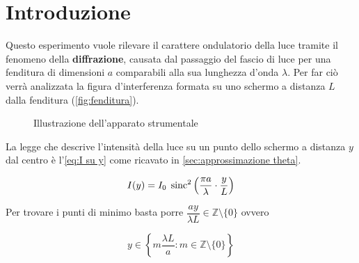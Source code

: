 \documentclass[../main.tex]{subfiles}
\begin{document}
\section{Introduzione}

Questo esperimento vuole rilevare il carattere ondulatorio della luce tramite il fenomeno della \textbf{diffrazione}, causata dal passaggio del fascio di luce per una fenditura di dimensioni $a$ comparabili alla sua lunghezza d'onda $\lambda$. Per far ciò verrà analizzata la figura d'interferenza formata su uno schermo a distanza $L$ dalla fenditura (\autoref{fig:fenditura}).

\begin{figure}[ht!]
    \centering
    \caption{Illustrazione dell'apparato strumentale}
    \label{fig:fenditura}
\end{figure}

La legge che descrive l'intensità della luce su un punto dello schermo a distanza $y$ dal centro è l'\autoref{eq:I su y} come ricavato in \autoref{sec:approssimazione theta}.

\begin{equation} \label{eq:I su y}
    I(y) = I_{0} \; \operatorname{sinc}^{2} \left( \frac{\pi a}{\lambda} \cdot \frac{y}{L}  \right)
\end{equation}

Per trovare i punti di minimo basta porre $\dfrac{a y}{\lambda L} \in \mathbb{Z} \setminus \{0\}$ ovvero

\begin{equation} \label{eq:y=0 values}
    y \in \left\{m\frac{\lambda L}{a}: m \in \mathbb{Z} \setminus \{0\} \right\}
\end{equation}

\end{document}
